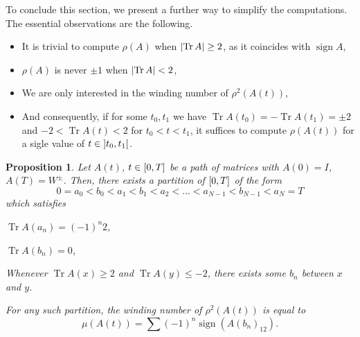 \documentclass{article}
\newtheorem{prop}{Proposition}
\theoremstyle{nonumberplain}
\DeclareMathOperator{\sign}{sign}
\DeclarePairedDelimiter{\abs}{\lvert}{\rvert}
\DeclareMathOperator{\trace}{Tr}
\begin{document}
To conclude this section, we present a further way to simplify the computations. The essential observations are the following.
\begin{itemize}
\item It is trivial to compute $\rho(A)$ when $\abs{\trace A} \geq 2$, as it coincides with $\sign A$,
\item $\rho(A)$ is never $\pm 1$ when $\abs{\trace A} < 2$,
\item We are only interested in the winding number of $\rho^2(A(t))$,
\item And consequently, if for some $t_0, t_1$ we have $\trace A(t_0) = - \trace A(t_1) = \pm 2$ and $-2 < \trace A(t) < 2$ for $t_0 < t < t_1$, it suffices to compute $\rho(A(t))$ for a sigle value of $t \in \ointerval{t_0}{t_1}$.
\end{itemize}

\begin{prop}
Let $A(t)$, $t \in \interval 0 T$ be a path of matrices with $A(0) = I$, $A(T) =W^\pm$. Then, there exists a partition of $\interval 0 T$ of the form
\begin{equation}\label{calcmaslov:ab1}
0 = a_0 < b_0 < a_1 < b_1 < a_2 < \dots < a_{N-1} < b_{N-1} < a_N = T
\end{equation}
which satisfies \begin{enumerate*}\item\label{calcmaslov:ab2} $\trace A(a_n) = (-1)^n 2$, \item\label{calcmaslov:ab3} $\trace A(b_n) = 0$, \item\label{calcmaslov:ab4} Whenever $\trace A(x) \geq 2$ and $\trace A(y) \leq -2$, there exists some $b_n$ between $x$ and $y$.\end{enumerate*}

For any such partition, the winding number of $\rho^2(A(t))$ is equal to
\begin{equation}\label{calcmaslov:mu}
\mu(A(t)) = \sum (-1)^n \sign(A(b_n)_{12}).
\end{equation}
\end{prop}
\end{document}

